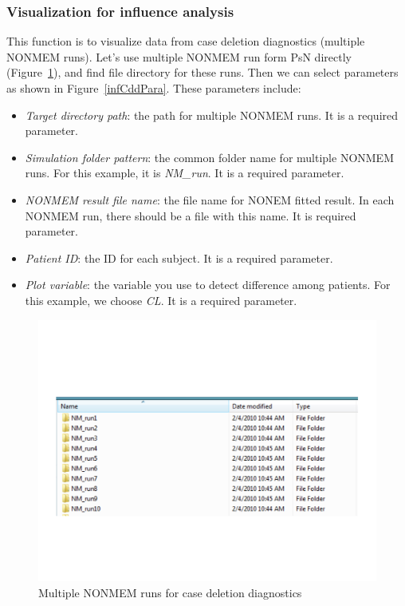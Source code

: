 \documentclass[a4paper]{article}
\begin{document}
\subsubsection{Visualization for influence analysis}
This function is to visualize data from case deletion diagnostics (multiple NONMEM runs). Let's use multiple NONMEM run form PsN directly (Figure~\ref{infCddData}), and find file directory for these runs. Then we can select parameters as shown in Figure~\ref{infCddPara}.  These parameters include:
\begin{itemize}
	\item \textit{Target directory path}: the path for multiple NONMEM runs. It is a required parameter.
	\item \textit{Simulation folder pattern}: the common folder name for multiple NONMEM runs. For this example, it is \textit{NM\_run}. It is a required parameter.
	\item \textit{NONMEM result file name}: the file name for NONEM fitted result. In each NONMEM run, there should be a file with this name. It is required parameter.	
	\item \textit{Patient ID}: the ID for each subject. It is a required parameter.
	\item \textit{Plot variable}: the variable you use to detect difference among patients. For this example, we choose \textit{CL}. It is a required parameter.
\end{itemize}
\begin{figure}[h!tb] \centering
\includegraphics[scale=0.6]{infCddData.pdf}
\caption{Multiple NONMEM runs for case deletion diagnostics}
\label{infCddData}
\end{figure}
\end{document}
